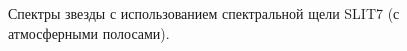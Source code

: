 \documentclass[a4paper]{article}
\begin{document}
\begin{figure}[h]
\begin{minipage}[h]{0.50\linewidth}
\end{minipage}
\caption{Спектры звезды с использованием спектральной щели SLIT7 (с атмосферными полосами).}
\label{ris:image2}
\end{figure}

\begin{figure}[h]
\begin{minipage}[h]{0.50\linewidth}
\end{minipage}
\begin{minipage}[h]{0.50\linewidth}
\end{minipage}
\begin{minipage}[h]{0.50\linewidth}

\end{minipage}
\end{figure}
\end{document}
